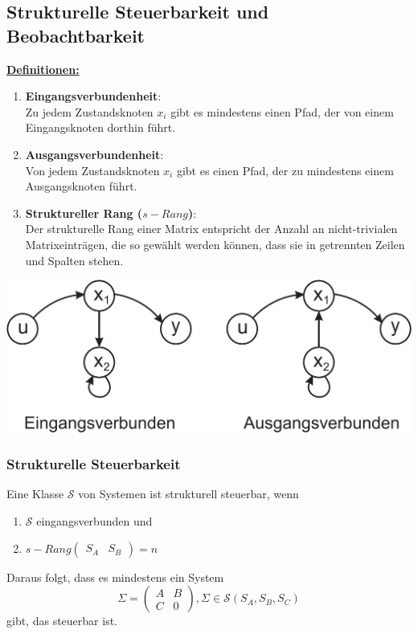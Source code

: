 \documentclass[a4paper,twocolumn,10pt]{article}
\begin{document}
\subsection{Strukturelle Steuerbarkeit und Beobachtbarkeit}
\underline{\textbf{Definitionen:}}
\begin{enumerate}[label=$\bullet$]
\item \textbf{Eingangsverbundenheit}:\\
Zu jedem Zustandsknoten $x_i$ gibt es mindestens einen Pfad, der von einem Eingangsknoten dorthin führt.
\item \textbf{Ausgangsverbundenheit}:\\
Von jedem Zustandsknoten $x_i$ gibt es einen Pfad, der zu mindestens einem Ausgangsknoten führt.
\item \textbf{Struktureller Rang ($s-Rang$)}:\\
Der strukturelle Rang einer Matrix entspricht der Anzahl an nicht-trivialen Matrixeinträgen, die so gewählt werden können, dass sie in getrennten Zeilen und Spalten stehen.
\end{enumerate}
\begin{center}
\includegraphics[width=0.9\columnwidth]{Grafiken/Ein_Ausgangsverbundenheit}
\end{center}

\subsubsection{Strukturelle Steuerbarkeit}
Eine Klasse $\mathcal{S}$ von Systemen ist strukturell steuerbar, wenn
\begin{enumerate}[label=$\bullet$]
\item $\mathcal{S}$ eingangsverbunden und
\item $s-Rang\begin{pmatrix}S_A & S_B\end{pmatrix}=n$
\end{enumerate}
Daraus folgt, dass es mindestens ein System
\begin{equation*}
\Sigma=\begin{pmatrix}A & B \\ C & 0\end{pmatrix},\Sigma\in\mathcal{S}(S_A,S_B,S_C)
\end{equation*}
gibt, das steuerbar ist.
\end{document}

